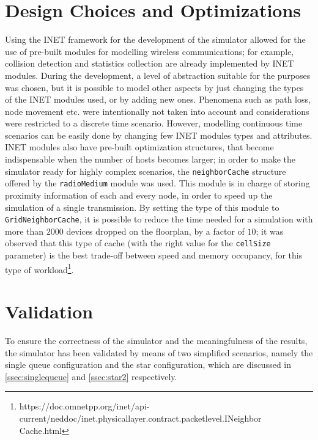 \section{Design Choices and Optimizations}
Using the INET framework for the development of the simulator allowed for the
use of pre-built modules for modelling wireless communications; for example,
collision detection and statistics collection are already implemented by INET
modules. During the development, a level of abstraction suitable for the
purposes was chosen, but it is possible to model other aspects by just 
changing the types of the INET modules used, or by adding new ones. Phenomena
such as path loss, node movement etc. were intentionally not taken into account
and considerations were restricted to a discrete time scenario. However,
modelling continuous time scenarios can be easily done by changing few INET
modules types and attributes.\\
INET modules also have pre-built optimization structures, that become
indispensable when the number of hosts becomes larger; in order to make the
simulator ready for highly complex scenarios, the \texttt{neighborCache}
structure offered by the \texttt{radioMedium} module was used. This module is
in charge of storing proximity information of each and every node, in order to
speed up the simulation of a single transmission. By setting the type of this
module to \texttt{GridNeighborCache}, it is possible to reduce the time needed
for a simulation with more than $2000$ devices dropped on the floorplan, by a
factor of $10$; it was observed that this type of cache (with the right value
for the \texttt{cellSize} parameter) is the best trade-off between speed and
memory occupancy, for this type of
workload\footnote{https://doc.omnetpp.org/inet/api-current/neddoc/inet.physicallayer.contract.packetlevel.INeighbor\\
Cache.html}.  
\section{Validation}
To ensure the correctness of the simulator and the meaningfulness of the
results, the simulator has been validated by means of two simplified scenarios,
namely the single queue configuration and the star configuration, which are
discussed in \ref{ssec:singlequeue} and \ref{ssec:star2} respectively.
